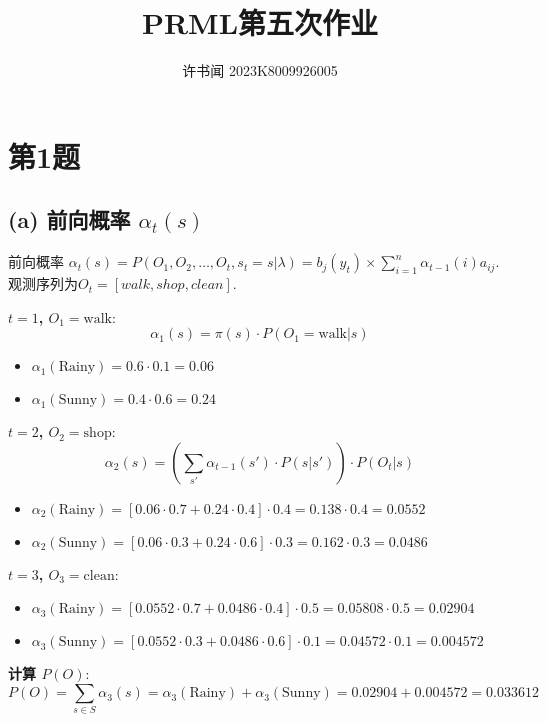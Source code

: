 \documentclass{article}
\begin{document}
\title{PRML第五次作业}
\author{许书闻 2023K8009926005}
\maketitle
\section*{第1题}

\subsection*{(a) 前向概率 \(\alpha_t(s)\)}

前向概率 \(\alpha_t(s) = P(O_1, O_2, \dots, O_t, s_t = s | \lambda)=b_j(y_t)\times \sum_{i=1}^{n}\alpha_{t-1}(i)a_{ij}\).
观测序列为\(O_t=[walk,shop,clean]\).

\textbf{\( t=1 \), \( O_1 = \text{walk} \)}: 
\[
\alpha_1(s) = \pi(s) \cdot P(O_1 = \text{walk} | s)
\]
\begin{itemize}
    \item \(\alpha_1(\text{Rainy}) = 0.6 \cdot 0.1 = 0.06\)
    \item \(\alpha_1(\text{Sunny}) = 0.4 \cdot 0.6 = 0.24\)
\end{itemize}

\textbf{\( t=2 \), \( O_2 = \text{shop} \)}: 
\[
\alpha_2(s) = \left( \sum_{s'} \alpha_{t-1}(s') \cdot P(s | s') \right) \cdot P(O_t | s)
\]
\begin{itemize}
    \item \(\alpha_2(\text{Rainy}) = [0.06 \cdot 0.7 + 0.24 \cdot 0.4] \cdot 0.4 = 0.138 \cdot 0.4 = 0.0552\)
    \item \(\alpha_2(\text{Sunny}) = [0.06 \cdot 0.3 + 0.24 \cdot 0.6] \cdot 0.3 = 0.162 \cdot 0.3 = 0.0486\)
\end{itemize}

\textbf{\( t=3 \), \( O_3 = \text{clean} \)}: 
\begin{itemize}
    \item \(\alpha_3(\text{Rainy}) = [0.0552 \cdot 0.7 + 0.0486 \cdot 0.4] \cdot 0.5 = 0.05808 \cdot 0.5 = 0.02904\)
    \item \(\alpha_3(\text{Sunny}) = [0.0552 \cdot 0.3 + 0.0486 \cdot 0.6] \cdot 0.1 = 0.04572 \cdot 0.1 = 0.004572\)
\end{itemize}

\textbf{计算 \( P(O) \)}:
\[
P(O) = \sum_{s \in S} \alpha_3(s) = \alpha_3(\text{Rainy}) + \alpha_3(\text{Sunny}) = 0.02904 + 0.004572 = 0.033612
\]
\end{document}
